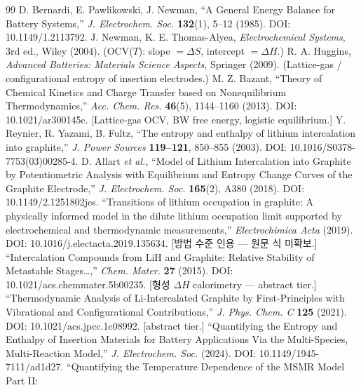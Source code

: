 \documentclass[11pt,a4paper]{article}
\begin{document}
\begin{thebibliography}{99}
 D. Bernardi, E. Pawlikowski, J. Newman,
  ``A General Energy Balance for Battery Systems,''
  \emph{J. Electrochem. Soc.} \textbf{132}(1), 5--12 (1985).
  DOI: 10.1149/1.2113792.
 J. Newman, K. E. Thomas-Alyea,
  \emph{Electrochemical Systems}, 3rd ed., Wiley (2004).
  (OCV($T$): slope $= \Delta S$, intercept $= \Delta H$.)
 R. A. Huggins,
  \emph{Advanced Batteries: Materials Science Aspects},
  Springer (2009).
  (Lattice-gas / configurational entropy of insertion electrodes.)
 M. Z. Bazant,
  ``Theory of Chemical Kinetics and Charge Transfer based on Nonequilibrium
  Thermodynamics,''
  \emph{Acc. Chem. Res.} \textbf{46}(5), 1144--1160 (2013).
  DOI: 10.1021/ar300145c.
  [Lattice-gas OCV, BW free energy, logistic equilibrium.]
 Y. Reynier, R. Yazami, B. Fultz,
  ``The entropy and enthalpy of lithium intercalation into graphite,''
  \emph{J. Power Sources} \textbf{119--121}, 850--855 (2003).
  DOI: 10.1016/S0378-7753(03)00285-4.
 D. Allart \emph{et al.},
  ``Model of Lithium Intercalation into Graphite by Potentiometric Analysis
  with Equilibrium and Entropy Change Curves of the Graphite Electrode,''
  \emph{J. Electrochem. Soc.} \textbf{165}(2), A380 (2018).
  DOI: 10.1149/2.1251802jes.
  ``Transitions of lithium occupation in graphite: A physically informed model
  in the dilute lithium occupation limit supported by electrochemical and
  thermodynamic measurements,''
  \emph{Electrochimica Acta} (2019). DOI: 10.1016/j.electacta.2019.135634.
  [방법 수준 인용 --- 원문 식 미확보.]
  ``Intercalation Compounds from LiH and Graphite: Relative Stability of
  Metastable Stages\ldots,''
  \emph{Chem. Mater.} \textbf{27} (2015). DOI: 10.1021/acs.chemmater.5b00235.
  [형성 $\Delta H$ calorimetry --- abstract tier.]
  ``Thermodynamic Analysis of Li-Intercalated Graphite by First-Principles
  with Vibrational and Configurational Contributions,''
  \emph{J. Phys. Chem. C} \textbf{125} (2021). DOI: 10.1021/acs.jpcc.1c08992.
  [abstract tier.]
  ``Quantifying the Entropy and Enthalpy of Insertion Materials for Battery
  Applications Via the Multi-Species, Multi-Reaction Model,''
  \emph{J. Electrochem. Soc.} (2024). DOI: 10.1149/1945-7111/ad1d27.
  ``Quantifying the Temperature Dependence of the MSMR Model Part II:

\end{thebibliography}
\end{document}
